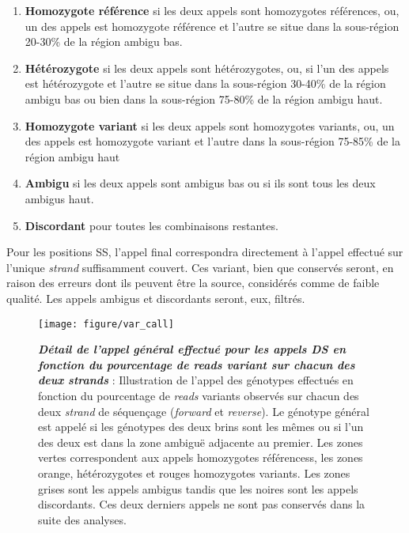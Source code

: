 \documentclass[12pt,twoside]{ugathesis}
\providecommand{\tightlist}{%
  \setlength{\itemsep}{0pt}\setlength{\parskip}{0pt}}
\begin{document}
\begin{enumerate}
\def\labelenumi{\arabic{enumi}.}
\tightlist
\item
  \textbf{Homozygote référence} si les deux appels sont homozygotes
  références, ou, un des appels est homozygote référence et l'autre se
  situe dans la sous-région 20-30\% de la région ambigu bas.\\
\item
  \textbf{Hétérozygote} si les deux appels sont hétérozygotes, ou, si
  l'un des appels est hétérozygote et l'autre se situe dans la
  sous-région 30-40\% de la région ambigu bas ou bien dans la
  sous-région 75-80\% de la région ambigu haut.\\
\item
  \textbf{Homozygote variant} si les deux appels sont homozygotes
  variants, ou, un des appels est homozygote variant et l'autre dans la
  sous-région 75-85\% de la région ambigu haut
\item
  \textbf{Ambigu} si les deux appels sont ambigus bas ou si ils sont
  tous les deux ambigus haut.\\
\item
  \textbf{Discordant} pour toutes les combinaisons restantes.
\end{enumerate}

Pour les positions SS, l'appel final correspondra directement à l'appel
effectué sur l'unique \emph{strand} suffisamment couvert. Ces variant,
bien que conservés seront, en raison des erreurs dont ils peuvent être
la source, considérés comme de faible qualité. Les appels ambigus et
discordants seront, eux, filtrés.

\newpage

\begin{figure}

{\centering \texttt{[image: figure/var\_call]} 

}

\caption[Détail de l'appel général effectué pour les appels DS en fonction du pourcentage de *reads* variant sur chacun des deux *strands*]{\textbf{\emph{Détail de l'appel général effectué pour
les appels DS en fonction du pourcentage de \emph{reads} variant sur
chacun des deux \emph{strands}}} : Illustration de l'appel des génotypes
effectués en fonction du pourcentage de \emph{reads} variants observés
sur chacun des deux \emph{strand} de séquençage (\emph{forward} et
\emph{reverse}). Le génotype général est appelé si les génotypes des
deux brins sont les mêmes ou si l'un des deux est dans la zone ambiguë
adjacente au premier. Les zones vertes correspondent aux appels
homozygotes référencess, les zones orange, hétérozygotes et rouges
homozygotes variants. Les zones grises sont les appels ambigus tandis
que les noires sont les appels discordants. Ces deux derniers appels ne
sont pas conservés dans la suite des analyses.}\label{fig:picvarcall}
\end{figure}
\end{document}
